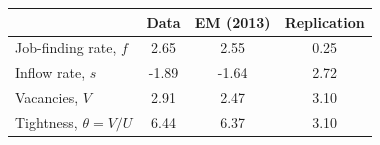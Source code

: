 \begin{tabular}{lccc}
\toprule
 & Data & EM (2013) & Replication \\
\midrule
Job-finding rate, $f$ & 2.65 & 2.55 & 0.25 \\
Inflow rate, $s$ & -1.89 & -1.64 & 2.72 \\
Vacancies, $V$ & 2.91 & 2.47 & 3.10 \\
Tightness, $\theta = V/U$ & 6.44 & 6.37 & 3.10 \\
\bottomrule
\end{tabular}
